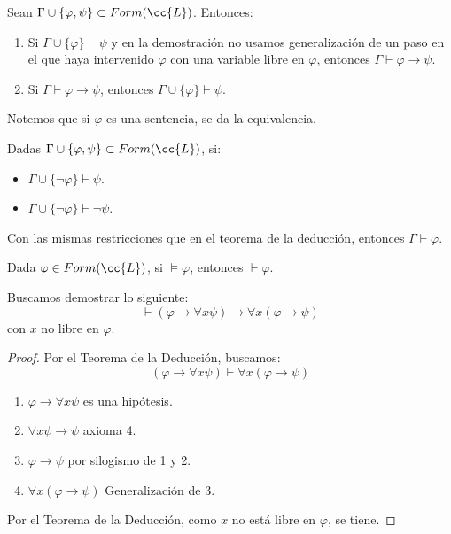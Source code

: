 \begin{teo}[de la Deducción]
    Sean $\Gamma\cup\{\varphi,\psi\}\subset Form(\cc{L})$. Entonces:
    \begin{enumerate}
        \item Si $\Gamma\cup\{\varphi\}\vdash\psi$ y en la demostración no usamos generalización de un paso en el que haya intervenido $\varphi$ con una variable libre en $\varphi$, entonces $\Gamma\vdash\varphi\to\psi$.
        \item Si $\Gamma\vdash\varphi\to\psi$, entonces $\Gamma\cup\{\varphi\}\vdash\psi$.
    \end{enumerate}

    Notemos que si $\varphi$ es una sentencia, se da la equivalencia.
\end{teo}

\begin{teo}
    Dadas $\Gamma\cup\{\varphi,\psi\}\subset Form(\cc{L})$, si:
    \begin{itemize}
        \item $\Gamma\cup\{\neg\varphi\}\vdash\psi$.
        \item $\Gamma\cup\{\neg\varphi\}\vdash\lnot\psi$.
    \end{itemize}
    Con las mismas restricciones que en el teorema de la deducción, entonces $\Gamma\vdash\varphi$.
\end{teo}


\begin{teo}
    Dada $\varphi\in Form(\cc{L})$, si $\vDash\varphi$, entonces $\vdash\varphi$.
\end{teo}


\begin{ejemplo}
    Buscamos demostrar lo siguiente:
    \begin{equation*}
        \vdash (\varphi \to \forall x\psi)\to \forall x(\varphi\to \psi)
    \end{equation*}
    con $x$ no libre en $\varphi$.
    \begin{proof}
        Por el Teorema de la Deducción, buscamos:
        \begin{equation*}
            (\varphi \to \forall x\psi) \vdash \forall x(\varphi\to \psi)
        \end{equation*}
        \begin{enumerate}
            \item $\varphi \to \forall x\psi$ es una hipótesis.
            \item $\forall x\psi\to \psi$ axioma 4.
            \item $\varphi\to \psi$ por silogismo de 1 y 2.
            \item $\forall x(\varphi\to \psi)$ Generalización de $3$.
        \end{enumerate}

        Por el Teorema de la Deducción, como $x$ no está libre en $\varphi$, se tiene.
    \end{proof}
\end{ejemplo}

